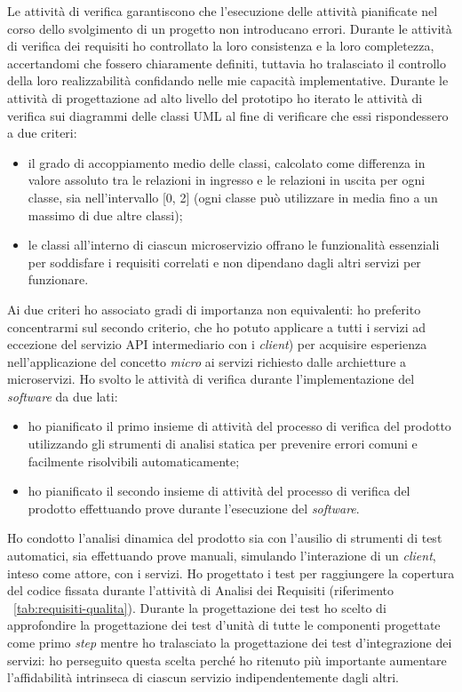 Le attività di verifica garantiscono che l'esecuzione delle attività pianificate nel corso dello svolgimento di un progetto non introducano errori.
Durante le attività di verifica dei requisiti ho controllato la loro consistenza e la loro completezza, accertandomi che fossero chiaramente definiti, tuttavia ho tralasciato il controllo della loro realizzabilità confidando nelle mie capacità implementative.
Durante le attività di progettazione ad alto livello del prototipo ho iterato le attività di verifica sui diagrammi delle classi UML al fine di verificare che essi rispondessero a due criteri:
\begin{itemize}
  \item il grado di accoppiamento medio delle classi, calcolato come differenza in valore assoluto tra le relazioni in ingresso e le relazioni in uscita per ogni classe, sia nell'intervallo [0, 2] (ogni classe può utilizzare in media fino a un massimo di due altre classi);
  \item le classi all'interno di ciascun microservizio offrano le funzionalità essenziali per soddisfare i requisiti correlati e non dipendano dagli altri servizi per funzionare.
\end{itemize}
Ai due criteri ho associato gradi di importanza non equivalenti: ho preferito concentrarmi sul secondo criterio, che ho potuto applicare a tutti i servizi ad eccezione del servizio API intermediario con i \emph{client}) per acquisire esperienza nell'applicazione del concetto \emph{micro} ai servizi richiesto dalle archietture a microservizi.
Ho svolto le attività di verifica durante l'implementazione del \emph{software} da due lati:
\begin{itemize}
  \item ho pianificato il primo insieme di attività del processo di verifica del prodotto utilizzando gli strumenti di analisi statica per prevenire errori comuni e facilmente risolvibili automaticamente;
  \item ho pianificato il secondo insieme di attività del processo di verifica del prodotto effettuando prove durante l'esecuzione del \emph{software}.
\end{itemize}
Ho condotto l'analisi dinamica del prodotto sia con l'ausilio di strumenti di test automatici, sia effettuando prove manuali, simulando l'interazione di un \emph{client}, inteso come attore, con i servizi.
Ho progettato i test per raggiungere la copertura del codice fissata durante l'attività di Analisi dei Requisiti (riferimento ~\ref{tab:requisiti-qualita}).
Durante la progettazione dei test ho scelto di approfondire la progettazione dei test d'unità di tutte le componenti progettate come primo \emph{step} mentre ho tralasciato la progettazione dei test d'integrazione dei servizi: ho perseguito questa scelta perché ho ritenuto più importante aumentare l'affidabilità intrinseca di ciascun servizio indipendentemente dagli altri.
